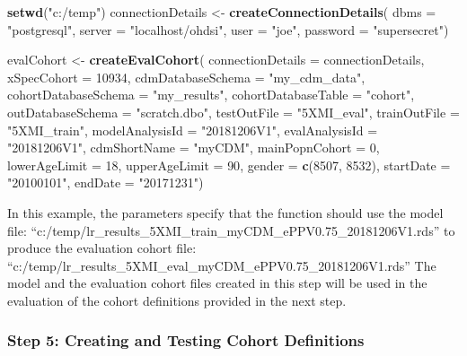 \documentclass[11pt]{book}
\newenvironment{Shaded}{\begin{snugshade}}{\end{snugshade}}
\newcommand{\KeywordTok}[1]{\textcolor[rgb]{0.13,0.29,0.53}{\textbf{#1}}}
\newcommand{\DataTypeTok}[1]{\textcolor[rgb]{0.13,0.29,0.53}{#1}}
\newcommand{\DecValTok}[1]{\textcolor[rgb]{0.00,0.00,0.81}{#1}}
\newcommand{\StringTok}[1]{\textcolor[rgb]{0.31,0.60,0.02}{#1}}
\newcommand{\NormalTok}[1]{#1}
\theoremstyle{definition}
\theoremstyle{definition}
\theoremstyle{definition}
\theoremstyle{remark}
\begin{document}
\begin{Shaded}
\begin{Highlighting}[]
\KeywordTok{setwd}\NormalTok{(}\StringTok{"c:/temp"}\NormalTok{)}
\NormalTok{connectionDetails <-}\StringTok{ }\KeywordTok{createConnectionDetails}\NormalTok{(}
  \DataTypeTok{dbms =} \StringTok{"postgresql"}\NormalTok{,}
  \DataTypeTok{server =} \StringTok{"localhost/ohdsi"}\NormalTok{,}
  \DataTypeTok{user =} \StringTok{"joe"}\NormalTok{,}
  \DataTypeTok{password =} \StringTok{"supersecret"}\NormalTok{)}

\NormalTok{evalCohort <-}\StringTok{ }\KeywordTok{createEvalCohort}\NormalTok{(}
  \DataTypeTok{connectionDetails =}\NormalTok{ connectionDetails,}
  \DataTypeTok{xSpecCohort =} \DecValTok{10934}\NormalTok{,}
  \DataTypeTok{cdmDatabaseSchema =} \StringTok{"my_cdm_data"}\NormalTok{,}
  \DataTypeTok{cohortDatabaseSchema =} \StringTok{"my_results"}\NormalTok{,}
  \DataTypeTok{cohortDatabaseTable =} \StringTok{"cohort"}\NormalTok{,}
  \DataTypeTok{outDatabaseSchema =} \StringTok{"scratch.dbo"}\NormalTok{,}
  \DataTypeTok{testOutFile =} \StringTok{"5XMI_eval"}\NormalTok{,}
  \DataTypeTok{trainOutFile =} \StringTok{"5XMI_train"}\NormalTok{,}
  \DataTypeTok{modelAnalysisId =} \StringTok{"20181206V1"}\NormalTok{,}
  \DataTypeTok{evalAnalysisId =} \StringTok{"20181206V1"}\NormalTok{,}
  \DataTypeTok{cdmShortName =} \StringTok{"myCDM"}\NormalTok{,}
  \DataTypeTok{mainPopnCohort =} \DecValTok{0}\NormalTok{,}
  \DataTypeTok{lowerAgeLimit =} \DecValTok{18}\NormalTok{,}
  \DataTypeTok{upperAgeLimit =} \DecValTok{90}\NormalTok{, }
  \DataTypeTok{gender =} \KeywordTok{c}\NormalTok{(}\DecValTok{8507}\NormalTok{, }\DecValTok{8532}\NormalTok{),}
  \DataTypeTok{startDate =} \StringTok{"20100101"}\NormalTok{,}
  \DataTypeTok{endDate =} \StringTok{"20171231"}\NormalTok{)}
\end{Highlighting}
\end{Shaded}

In this example, the parameters specify that the function should use the
model file:
``c:/temp/lr\_results\_5XMI\_train\_myCDM\_ePPV0.75\_20181206V1.rds'' to
produce the evaluation cohort file:
``c:/temp/lr\_results\_5XMI\_eval\_myCDM\_ePPV0.75\_20181206V1.rds'' The
model and the evaluation cohort files created in this step will be used
in the evaluation of the cohort definitions provided in the next step.

\subsubsection*{Step 5: Creating and Testing Cohort
Definitions}\label{step-5-creating-and-testing-cohort-definitions}
\end{document}
